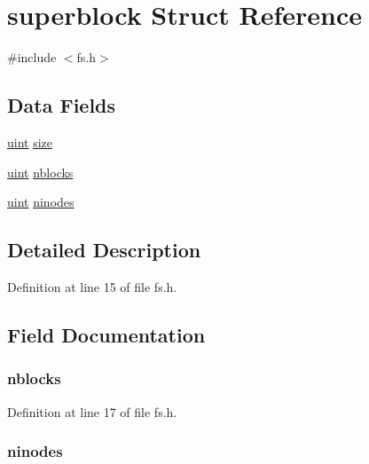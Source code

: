 \hypertarget{structsuperblock}{\section{superblock Struct Reference}
\label{structsuperblock}
}


{\ttfamily \#include $<$fs.\-h$>$}

\subsection*{Data Fields}
\begin{DoxyCompactItemize}
\item 
\hyperlink{types_8h_a91ad9478d81a7aaf2593e8d9c3d06a14}{uint} \hyperlink{structsuperblock_a22d26304a3b3aca97e6311f6939dd1bf}{size}
\item 
\hyperlink{types_8h_a91ad9478d81a7aaf2593e8d9c3d06a14}{uint} \hyperlink{structsuperblock_acca6315b99c9786037236e521f8b2556}{nblocks}
\item 
\hyperlink{types_8h_a91ad9478d81a7aaf2593e8d9c3d06a14}{uint} \hyperlink{structsuperblock_a9df4c697e9b13fc3226bb66e46b3b409}{ninodes}
\end{DoxyCompactItemize}


\subsection{Detailed Description}


Definition at line 15 of file fs.\-h.



\subsection{Field Documentation}
\hypertarget{structsuperblock_acca6315b99c9786037236e521f8b2556}{
\subsubsection[{nblocks}]{ nblocks}}\label{structsuperblock_acca6315b99c9786037236e521f8b2556}


Definition at line 17 of file fs.\-h.

\hypertarget{structsuperblock_a9df4c697e9b13fc3226bb66e46b3b409}{
\subsubsection[{ninodes}]{ ninodes}}\label{structsuperblock_a9df4c697e9b13fc3226bb66e46b3b409}



